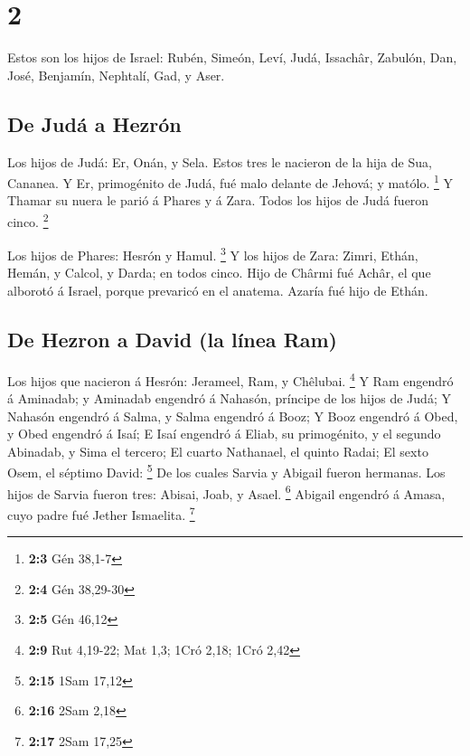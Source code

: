 \hypertarget{section-1}{%
\section{2}\label{section-1}}

 Estos son los hijos de Israel: Rubén, Simeón, Leví, Judá,
Issachâr, Zabulón,  Dan, José, Benjamín, Nephtalí, Gad, y
Aser.

\hypertarget{de-juduxe1-a-hezruxf3n}{%
\subsection{De Judá a Hezrón}\label{de-juduxe1-a-hezruxf3n}}

 Los hijos de Judá: Er, Onán, y Sela. Estos tres le
nacieron de la hija de Sua, Cananea. Y Er, primogénito de Judá, fué malo
delante de Jehová; y matólo. \footnote{\textbf{2:3} Gén 38,1-7}
 Y Thamar su nuera le parió á Phares y á Zara. Todos los
hijos de Judá fueron cinco. \footnote{\textbf{2:4} Gén 38,29-30}

 Los hijos de Phares: Hesrón y Hamul. \footnote{\textbf{2:5}
  Gén 46,12}  Y los hijos de Zara: Zimri, Ethán, Hemán, y
Calcol, y Darda; en todos cinco.  Hijo de Chârmi fué
Achâr, el que alborotó á Israel, porque prevaricó en el anatema.
 Azaría fué hijo de Ethán.

\hypertarget{de-hezron-a-david-la-luxednea-ram}{%
\subsection{De Hezron a David (la línea
Ram)}\label{de-hezron-a-david-la-luxednea-ram}}

 Los hijos que nacieron á Hesrón: Jerameel, Ram, y
Chêlubai. \footnote{\textbf{2:9} Rut 4,19-22; Mat 1,3; 1Cró 2,18; 1Cró
  2,42}  Y Ram engendró á Aminadab; y Aminadab engendró á
Nahasón, príncipe de los hijos de Judá;  Y Nahasón
engendró á Salma, y Salma engendró á Booz;  Y Booz
engendró á Obed, y Obed engendró á Isaí;  E Isaí engendró
á Eliab, su primogénito, y el segundo Abinadab, y Sima el tercero;
 El cuarto Nathanael, el quinto Radai;  El
sexto Osem, el séptimo David: \footnote{\textbf{2:15} 1Sam 17,12}
 De los cuales Sarvia y Abigail fueron hermanas. Los
hijos de Sarvia fueron tres: Abisai, Joab, y Asael. \footnote{\textbf{2:16}
  2Sam 2,18}  Abigail engendró á Amasa, cuyo padre fué
Jether Ismaelita. \footnote{\textbf{2:17} 2Sam 17,25}

